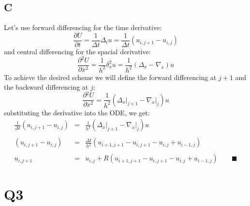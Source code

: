 \documentclass[11pt, a4paper]{article}
\newcommand{\parder}[2]{\frac{\partial {#1}}{\partial {#2}}}
\begin{document}
\subsection{C}
Let's use forward differencing for the time derivative:
\begin{equation}
    \parder{U}{t}=\frac{1}{\Delta t}\Delta_tu=\frac{1}{\Delta t}\left(u_{i,j+1}-u_{i,j}\right)
\end{equation}
and central differencing for the spacial derivative:
\begin{equation}
    \parder{^2U}{x^2}=\frac{1}{h^2}\delta_x^2u=\frac{1}{h^2}\left(\Delta_x-\nabla_x\right)u
\end{equation}
To achieve the desired scheme we will define the forward differencing at $j+1$ and the backward differencing at $j$:
\begin{equation}
    \parder{^2U}{x^2}=\frac{1}{h^2}\left(\left.\Delta_x\right|_{j+1}-\left.\nabla_x\right|_j\right)u
\end{equation}
substituting the derivative into the ODE, we get:
\begin{equation}
    \begin{array}{rcl}
        \displaystyle \frac{1}{\Delta t}\left(u_{i,j+1}-u_{i,j}\right) & = & \displaystyle \frac{1}{h^2}\left(\left.\Delta_x\right|_{j+1}-\left.\nabla_x\right|_j\right)u \\\\
        \displaystyle \left(u_{i,j+1}-u_{i,j}\right) & = & \displaystyle \frac{\Delta t}{h^2}\left(u_{i+1,j+1}-u_{i,j+1}-u_{i,j}+u_{i-1,j}\right) \\\\
        \displaystyle u_{i,j+1} & = & \displaystyle u_{i,j}+R\left(u_{i+1,j+1}-u_{i,j+1}-u_{i,j}+u_{i-1,j}\right)\qquad\blacksquare
    \end{array}
\end{equation}

\section{Q3}
\end{document}
